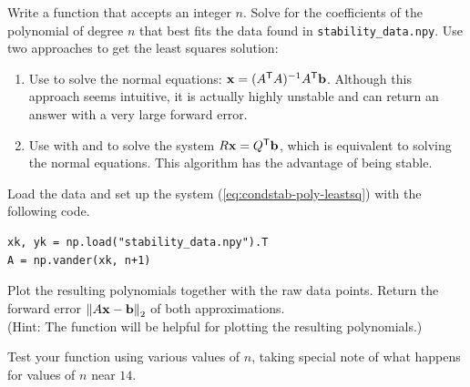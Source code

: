 \begin{problem}
Write a function that accepts an integer $n$.
Solve for the coefficients of the polynomial of degree $n$ that best fits the data found in \texttt{stability\_data.npy}.
Use two approaches to get the least squares solution:

\begin{enumerate}
\item Use  to solve the normal equations: $\mathbf{x} = (A^{\mathsf T} A)^{-1}A^{\mathsf T} \mathbf{b}$.
Although this approach seems intuitive, it is actually highly unstable and can return an answer with a very large forward error.

\item Use  with  and  to solve the system $R\mathbf{x} = Q^{\mathsf T}\mathbf{b}$, which is equivalent to solving the normal equations.
This algorithm has the advantage of being stable.
\end{enumerate}

Load the data and set up the system (\ref{eq:condstab-poly-leastsq}) with the following code.

\begin{lstlisting}
xk, yk = np.load("stability_data.npy").T
A = np.vander(xk, n+1)
\end{lstlisting}

Plot the resulting polynomials together with the raw data points.
Return the forward error $\left\lVert A\mathbf{x}-\mathbf{b}\right\rVert_2$ of both approximations.
\\(Hint: The function  will be helpful for plotting the resulting polynomials.)

Test your function using various values of $n$, taking special note of what happens for values of $n$ near $14$.

\end{problem}

